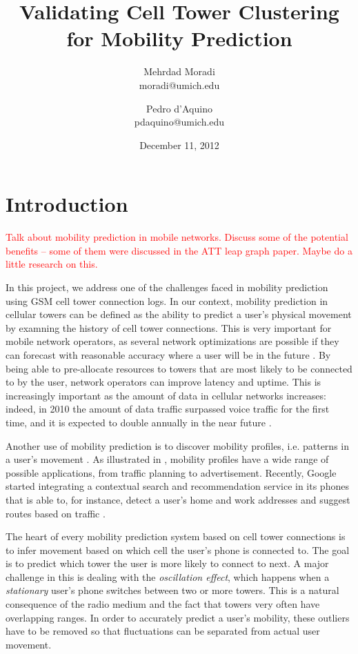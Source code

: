 \documentclass[a4paper,10pt]{article}
\newcommand{\xxx}[1]{\textcolor{red}{#1}}
\begin{document}
\title{Validating Cell Tower Clustering for Mobility Prediction}
\author{Mehrdad Moradi\\moradi@umich.edu \and Pedro d'Aquino\\pdaquino@umich.edu}
\date{December 11, 2012}

\maketitle

\section{Introduction}

\xxx{Talk about mobility prediction in mobile networks. Discuss some of the potential benefits -- some of them were discussed in the
ATT leap graph paper. Maybe do a little research on this.}

In this project, we address one of the challenges faced in mobility prediction using GSM cell tower connection logs. In our context, mobility prediction in cellular
towers can be defined as the ability to predict a user's physical movement by examning the history of cell tower connections. This is very important
for mobile network operators, as several network optimizations are possible if they can forecast with reasonable accuracy
where a user will be in the future \cite{LeapGraph} \cite{Liu97anoptimal}. By being able to pre-allocate resources to towers that are most likely to
be connected to by the user, network operators can improve latency and uptime. This is increasingly important as the amount of data in cellular networks
increases: indeed, in 2010 the amount of data traffic surpassed voice traffic for the first time, and it is expected to double annually in the near future
\cite{EricssonData}.

Another use of mobility prediction is to discover mobility profiles, i.e. patterns in a user's movement \cite{mobilityprofiler}. As illustrated in \cite{mobilityprofiler}, mobility profiles have a wide range of possible applications, from traffic planning to advertisement. Recently, Google started integrating
a contextual search and recommendation service in its phones that is able to, for instance, detect a user's home and work addresses and suggest routes based on
traffic \cite{googleNow}.


The heart of every mobility prediction system based on cell tower connections is to infer movement based on which cell the user's phone is connected to. The goal
is to predict which tower the user is more likely to connect to next. A major challenge in this is dealing with the \textit{oscillation effect}, which happens when a \textit{stationary} user's phone switches between two or more towers. This is a natural consequence of the radio medium and the fact that towers very often have overlapping ranges. In order to accurately predict a user's mobility, these outliers have to be removed so that fluctuations can be separated from actual user movement.
\end{document}
